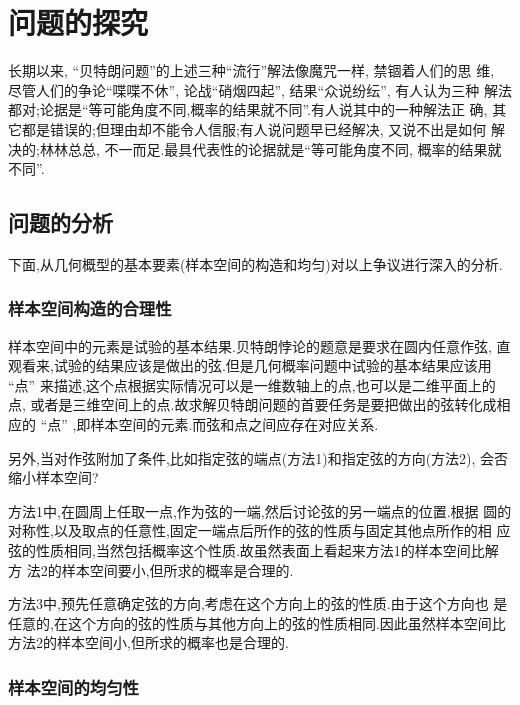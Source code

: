 \section{问题的探究}

长期以来, “贝特朗问题”的上述三种“流行”解法像魔咒一样, 禁锢着人们的思
维, 尽管人们的争论“喋喋不休”, 论战“硝烟四起”, 结果“众说纷纭”, 有人认为三种
解法都对;论据是“等可能角度不同,概率的结果就不同”.有人说其中的一种解法正
确, 其它都是错误的;但理由却不能令人信服;有人说问题早已经解决, 又说不出是如何
解决的;林林总总, 不一而足.最具代表性的论据就是“等可能角度不同, 概率的结果就不同”.

\subsection{问题的分析}

下面,从几何概型的基本要素(样本空间的构造和均匀)对以上争议进行深入的分析.

\subsubsection{样本空间构造的合理性}

样本空间中的元素是试验的基本结果.贝特朗悖论的题意是要求在圆内任意作弦,
直观看来,试验的结果应该是做出的弦.但是几何概率问题中试验的基本结果应该用
“点” 来描述,这个点根据实际情况可以是一维数轴上的点,也可以是二维平面上的点,
或者是三维空间上的点.故求解贝特朗问题的首要任务是要把做出的弦转化成相应的
“点” ,即样本空间的元素.而弦和点之间应存在对应关系.

\par 另外,当对作弦附加了条件,比如指定弦的端点(方法1)和指定弦的方向(方法2),
会否缩小样本空间?

\par 方法1中,在圆周上任取一点,作为弦的一端,然后讨论弦的另一端点的位置.根据
圆的对称性,以及取点的任意性,固定一端点后所作的弦的性质与固定其他点所作的相
应弦的性质相同,当然包括概率这个性质.故虽然表面上看起来方法1的样本空间比解方
法2的样本空间要小,但所求的概率是合理的.

\par 方法3中,预先任意确定弦的方向,考虑在这个方向上的弦的性质.由于这个方向也
是任意的,在这个方向的弦的性质与其他方向上的弦的性质相同.因此虽然样本空间比
方法2的样本空间小,但所求的概率也是合理的. \cite{张敏2015贝特朗悖论之争的终结}

\subsubsection{样本空间的均匀性}

